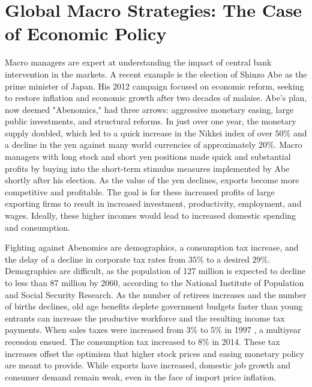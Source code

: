 \documentclass[11pt]{article}
\begin{document}
\section*{Global Macro Strategies: The Case of Economic Policy}
Macro managers are expert at understanding the impact of central bank intervention in the markets. A recent example is the election of Shinzo Abe as the prime minister of Japan. His 2012 campaign focused on economic reform, seeking to restore inflation and economic growth after two decades of malaise. Abe's plan, now deemed "Abenomics," had three arrows: aggressive monetary easing, large public investments, and structural reforms. In just over one year, the monetary supply doubled, which led to a quick increase in the Nikkei index of over $50 \%$ and a decline in the yen against many world currencies of approximately $20 \%$. Macro managers with long stock and short yen positions made quick and substantial profits by buying into the short-term stimulus measures implemented by Abe shortly after his election. As the value of the yen declines, exports become more competitive and profitable. The goal is for these increased profits of large exporting firms to result in increased investment, productivity, employment, and wages. Ideally, these higher incomes would lead to increased domestic spending and consumption.

Fighting against Abenomics are demographics, a consumption tax increase, and the delay of a decline in corporate tax rates from $35 \%$ to a desired $29 \%$. Demographics are difficult, as the population of 127 million is expected to decline to less than 87 million by 2060, according to the National Institute of Population and Social Security Research. As the number of retirees increases and the number of births declines, old age benefits deplete government budgets faster than young entrants can increase the productive workforce and the resulting income tax payments. When sales taxes were increased from $3 \%$ to $5 \%$ in 1997 , a multiyear recession ensued. The consumption tax increased to $8 \%$ in 2014. These tax increases offset the optimism that higher stock prices and easing monetary policy are meant to provide. While exports have increased, domestic job growth and consumer demand remain weak, even in the face of import price inflation.
\end{document}
